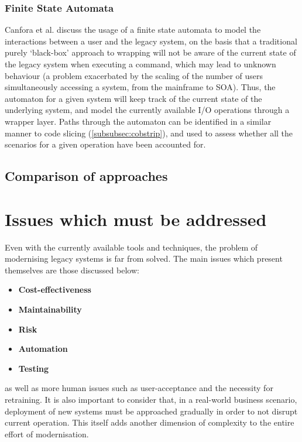 \documentclass[12pt,journal,compsoc]{IEEEtran}
\begin{document}
\subsubsection{Finite State Automata}
Canfora et al.\cite{Canfora2006,Canfora2008} discuss the usage of a finite state automata to model the interactions between a user and the legacy system, on the basis that a traditional purely `black-box' approach to wrapping will not be aware of the current state of the legacy system when executing a command, which may lead to unknown behaviour (a problem exacerbated by the scaling of the number of users simultaneously accessing a system, from the mainframe to SOA). Thus, the automaton for a given system will keep track of the current state of the underlying system, and model the currently available I/O operations through a wrapper layer. Paths through the automaton can be identified in a similar manner to code slicing (\autoref{subsubsec:cobstrip}), and used to assess whether all the scenarios for a given operation have been accounted for.

\subsection{Comparison of approaches}
\label{subsec:comparison}


\section{Issues which must be addressed}
\label{sec:issues}
Even with the currently available tools and techniques, the problem of modernising legacy systems is far from solved. The main issues which present themselves are those discussed below:
\begin{itemize}
\item\textbf{Cost-effectiveness}
\item\textbf{Maintainability}
\item\textbf{Risk}
\item\textbf{Automation}
\item\textbf{Testing}
\end{itemize}
as well as more human issues such as user-acceptance and the necessity for retraining. It is also important to consider that, in a real-world business scenario, deployment of new systems must be approached gradually in order to not disrupt current operation\cite{Sneed2008,Duncan1996,Almonaies2010}. This itself adds another dimension of complexity to the entire effort of modernisation.
\end{document}
